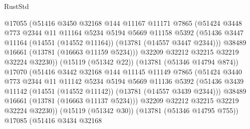 \begin{lexlean}{RustStd}
\begin{coremodule}
                        @17055
                        (@51416
                          @3450
                          @32168
                          @144
                          @11167
                          @11171
                          @7865
                          (@51424
                            @3448
                            @773
                            @2344
                            @11
                            @11164
                            @5234
                            @5194
                            @5669
                            @11158
                            @5392
                            (@51436
                              @3447
                              @11164
                              (@14551 (@14552 @11164))
                              (@13781 (@14557 @3447 @2344)))
                            @38489
                            @16661
                            (@13781 (@16663 @11159 @5234)))
                          @32209
                          @32212
                          @32215
                          @32219
                          @32224
                          @32230))
                      (@15119 (@51342 @22))
                      (@13781 (@51346 @14794 @874))
                      @17070
                      (@51416
                        @3442
                        @32168
                        @144
                        @11145
                        @11149
                        @7865
                        (@51424
                          @3440
                          @773
                          @2344
                          @11
                          @11142
                          @5234
                          @5194
                          @5669
                          @11136
                          @5392
                          (@51436
                            @3439
                            @11142
                            (@14551 (@14552 @11142))
                            (@13781 (@14557 @3439 @2344)))
                          @38489
                          @16661
                          (@13781 (@16663 @11137 @5234)))
                        @32209
                        @32212
                        @32215
                        @32219
                        @32224
                        @32230))
                    (@15119 (@51342 @30))
                    (@13781 (@51346 @14795 @755))
                    @17085
                    (@51416
                      @3434
                      @32168

\end{coremodule}
\end{lexlean}
